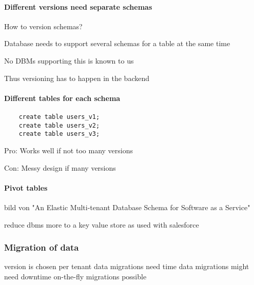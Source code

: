 \paragraph{Different versions need separate schemas}
How to version schemas?

  Database needs to support several schemas for a table at the same time

  No DBMs supporting this is known to us

  Thus versioning has to happen in the backend

  \paragraph{Different tables for each schema}
  \lstset{language=SQL, caption=sql, label=sql}
  \begin{lstlisting}
    create table users_v1;
    create table users_v2;
    create table users_v3;
  \end{lstlisting}

  Pro:
  Works well if not too many versions

  Con:
  Messy design if many versions


  \paragraph{Pivot tables}

  bild von "An Elastic Multi-tenant Database Schema for Software as a Service"

  reduce dbms more to a key value store
  as used with salesforce

\subsubsection{Migration of data}
  version is chosen per tenant
  data migrations need time
  data migrations might need downtime
  on-the-fly migrations possible

